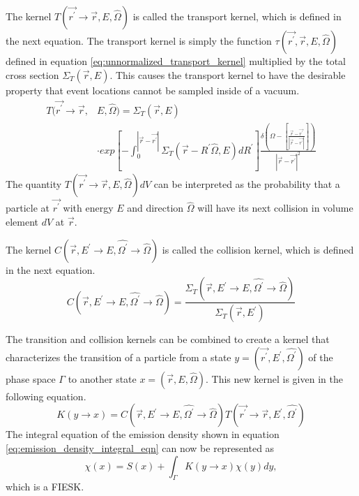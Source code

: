 The kernel $T(\vec{r^{'}} \to \vec{r},E,\hat{\Omega})$ is called the transport
kernel, which is defined in the next equation. The transport kernel is simply
the function $\tau(\vec{r^{'}},\vec{r},E,\hat{\Omega})$ defined in equation 
\ref{eq:unnormalized_transport_kernel} multiplied by the total cross section
$\Sigma_T(\vec{r},E)$. This causes the transport kernel to have the desirable
property that event locations cannot be sampled inside of a vacuum.
\begin{equation}
  \begin{split}
    T(\vec{r^{'}} \to \vec{r},&E,\hat{\Omega}) = \Sigma_T(\vec{r},E) \\
    &\cdot exp\left[-\int_0^{|\vec{r} - \vec{r^{'}}|} 
      \Sigma_T(\vec{r}-R^{'}\hat{\Omega},E)dR^{'} \right] 
    \frac{\delta \left(\Omega - \left[\frac{\vec{r} - \vec{r^{'}}}
        {|\vec{r} - \vec{r^{'}}|}\right]\right)}
    {|\vec{r} - \vec{r^{'}}|^2} 
  \end{split}
\end{equation}
The quantity $T(\vec{r^{'}} \to \vec{r},E,\hat{\Omega})dV$ can be interpreted
as the probability that a particle at $\vec{r^{'}}$ with energy $E$ and 
direction $\hat{\Omega}$ will have its next collision in volume element $dV$
at $\vec{r}$.  

The kernel $C(\vec{r},E^{'} \to E,\hat{\Omega^{'}} \to \hat{\Omega})$ is called
the collision kernel, which is defined in the next equation.
\begin{equation}
  C(\vec{r},E^{'} \to E,\hat{\Omega^{'}} \to \hat{\Omega}) = 
  \frac{\Sigma_T(\vec{r},E^{'} \to E,\hat{\Omega^{'}} \to \hat{\Omega})}
       {\Sigma_T(\vec{r},E^{'})}
\end{equation}

The transition and collision kernels can be combined to create a kernel that
characterizes the transition of a particle from a state 
$y = (\vec{r^{'}},E^{'},\hat{\Omega^{'}})$ of the phase space $\Gamma$ to another 
state $x = (\vec{r},E,\hat{\Omega})$. This new kernel is given in the following 
equation.
\begin{equation}
  K(y \to x) =
  C(\vec{r},E^{'} \to E,\hat{\Omega^{'}} \to \hat{\Omega})
    T(\vec{r^{'}} \to \vec{r},E^{'},\hat{\Omega^{'}})
\end{equation}
The integral equation of the emission density shown in equation 
\ref{eq:emission_density_integral_eqn} can now be represented as
\begin{equation*}
  \chi(x) = S(x) + \int_{\Gamma} K(y \to x)\chi(y)dy,
\end{equation*}
which is a FIESK. 

